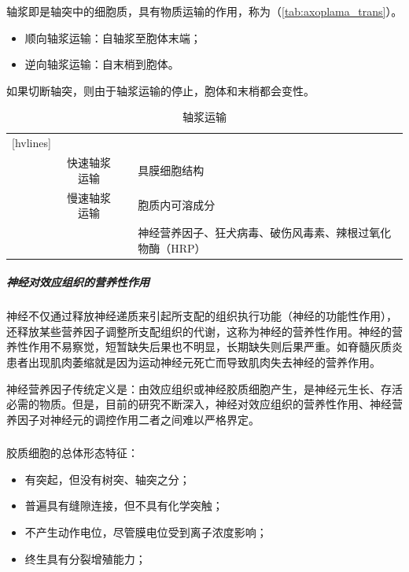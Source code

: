 轴浆即是轴突中的细胞质，具有物质运输的作用，称为（\autoref{tab:axoplama_trans}）。
\begin{itemize}
	\item 顺向轴浆运输：自轴浆至胞体末端；
	\item 逆向轴浆运输：自末梢到胞体。
\end{itemize}

如果切断轴突，则由于轴浆运输的停止，胞体和末梢都会变性。

\begin{table}[htbp]
	\centering
	\begin{NiceTabularX}{\textwidth}{cccX}[hvlines]
		 &  &  &  \\
		 & 快速轴浆运输 &  & 具膜细胞结构 \\
		& 慢速轴浆运输 &  & 胞质内可溶成分 \\
		 & &  & 神经营养因子、狂犬病毒、破伤风毒素、辣根过氧化物酶（HRP）
	\end{NiceTabularX}
	\caption{轴浆运输}
	\label{tab:axoplama_trans}
\end{table}

\subparagraph{神经对效应组织的营养性作用}

神经不仅通过释放神经递质来引起所支配的组织执行功能（神经的功能性作用），还释放某些营养因子调整所支配组织的代谢，这称为神经的营养性作用。神经的营养性作用不易察觉，短暂缺失后果也不明显，长期缺失则后果严重。如脊髓灰质炎患者出现肌肉萎缩就是因为运动神经元死亡而导致肌肉失去神经的营养作用。

神经营养因子传统定义是：由效应组织或神经胶质细胞产生，是神经元生长、存活必需的物质。但是，目前的研究不断深入，神经对效应组织的营养性作用、神经营养因子对神经元的调控作用二者之间难以严格界定。

\subsubsection{}

胶质细胞的总体形态特征：
\begin{itemize}
	\item 有突起，但没有树突、轴突之分；
	\item 普遍具有缝隙连接，但不具有化学突触；
	\item 不产生动作电位，尽管膜电位受到离子浓度影响；
	\item 终生具有分裂增殖能力；
\end{itemize}

